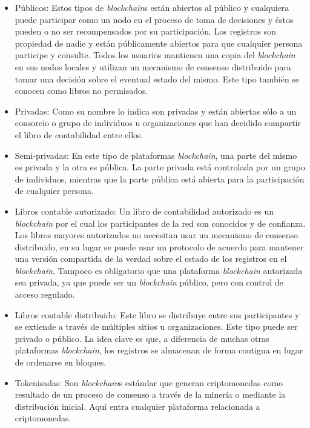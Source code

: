 \begin{itemize}
    \item Públicos:  Estos  tipos de \textit{blockchain}s están abiertos al público y cualquiera puede participar como un nodo en el proceso de toma de decisiones y éstos  pueden o no ser recompensados por su participación. Los registros son propiedad de nadie y están públicamente abiertos para que cualquier persona participe y consulte. Todos los usuarios  mantienen una copia del \textit{blockchain} en sus nodos locales y utilizan un mecanismo de consenso distribuido para tomar una decisión sobre el eventual estado del mismo. Este tipo  también se conocen como libros no permisados.
    \item Privadas: Como su nombre lo indica son privadas y están abiertas sólo a un consorcio o grupo de individuos u organizaciones que han decidido compartir el libro de contabilidad entre ellos.
    \item Semi-privadas: En este tipo de plataformas \textit{blockchain}, una parte del mismo es privada y la otra es pública. La parte privada está controlada por un grupo de individuos, mientras que la parte pública está abierta para la participación de cualquier persona.
    \item Libros contable autorizado: Un libro de contabilidad autorizado es un \textit{blockchain} por el cual los participantes de la red son conocidos y de confianza. Los libros mayores autorizados no necesitan usar un mecanismo de consenso distribuido, en su lugar se puede usar un protocolo de acuerdo para mantener una versión compartida de la verdad sobre el estado de los registros en el \textit{blockchain}. Tampoco es obligatorio que una plataforma \textit{blockchain} autorizada sea privada, ya que puede ser un \textit{blockchain} público, pero con control de acceso regulado.
    \item Libros contable distribuido: Este libro se distribuye entre sus participantes y se extiende a través de múltiples sitios u organizaciones. Este tipo puede ser privado o público. La idea clave es que, a diferencia de muchas otras plataformas \textit{blockchain}, los registros se almacenan de forma contigua en lugar de ordenarse en bloques.
    \item Tokenisadas: Son \textit{blockchain}s estándar que generan criptomonedas como resultado de un proceso de consenso a través de la minería o mediante la distribución inicial. Aquí entra cualquier plataforma relacionada a criptomonedas.
\end{itemize}

